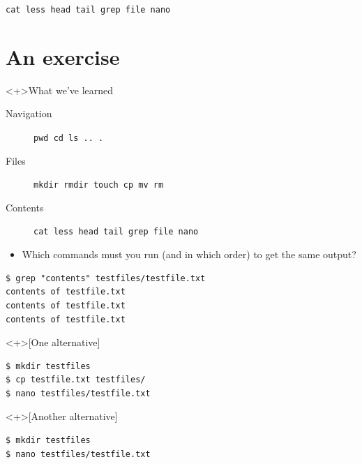 \begin{frame}[fragile]
  \begin{exercise}
    \begin{center}
      \lstinline[basicstyle=\Large]{cat less head tail grep file nano}
    \end{center}
  \end{exercise}
\end{frame}


\section{An exercise}

\begin{frame}[fragile]
  \begin{block}<+>{What we've learned}
    \begin{description}
      \item[Navigation] \lstinline{pwd cd ls .. .}
      \item[Files] \lstinline{mkdir rmdir touch cp mv rm}
      \item[Contents] \lstinline{cat less head tail grep file nano}
    \end{description}
  \end{block}

  \begin{exercise}
    \begin{itemize}
      \item Which commands must you run (and in which order) to get the same 
        output?
    \end{itemize}
    \begin{lstlisting}[numbers=none]
$ grep "contents" testfiles/testfile.txt
contents of testfile.txt
contents of testfile.txt
contents of testfile.txt
    \end{lstlisting}
  \end{exercise}
\end{frame}

\begin{frame}[fragile]
  \begin{solution}<+>[One alternative]
    \begin{lstlisting}[numbers=none]
$ mkdir testfiles
$ cp testfile.txt testfiles/
$ nano testfiles/testfile.txt
    \end{lstlisting}
  \end{solution}
  \begin{solution}<+>[Another alternative]
    \begin{lstlisting}[numbers=none]
$ mkdir testfiles
$ nano testfiles/testfile.txt
    \end{lstlisting}
  \end{solution}
\end{frame}



\begin{frame}[allowframebreaks]
  \printbibliography{}
\end{frame}
